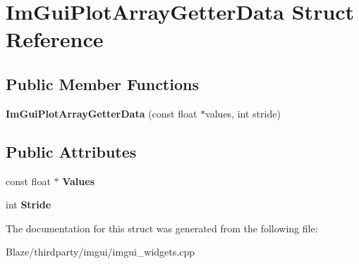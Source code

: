 \hypertarget{structImGuiPlotArrayGetterData}{}\section{Im\+Gui\+Plot\+Array\+Getter\+Data Struct Reference}
\label{structImGuiPlotArrayGetterData}
\subsection*{Public Member Functions}
\begin{DoxyCompactItemize}
\item 
\mbox{\label{structImGuiPlotArrayGetterData_a9c4037621f1c247957c04dc8ae1f2903}} 
{\bfseries Im\+Gui\+Plot\+Array\+Getter\+Data} (const float $\ast$values, int stride)
\end{DoxyCompactItemize}
\subsection*{Public Attributes}
\begin{DoxyCompactItemize}
\item 
\mbox{\label{structImGuiPlotArrayGetterData_aa40ff2e945549744fc622891089ae0fd}} 
const float $\ast$ {\bfseries Values}
\item 
\mbox{\label{structImGuiPlotArrayGetterData_aecb2cce4ea91d95ec81937de656cfcd6}} 
int {\bfseries Stride}
\end{DoxyCompactItemize}


The documentation for this struct was generated from the following file\+:\begin{DoxyCompactItemize}
\item 
Blaze/thirdparty/imgui/imgui\+\_\+widgets.\+cpp\end{DoxyCompactItemize}
